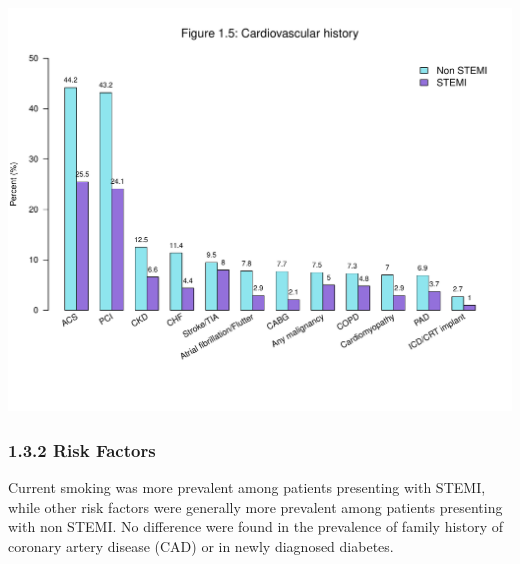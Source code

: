 \documentclass[
]{article}
\begin{document}
\includegraphics{‏‏ACSIS_2024_v1_with_trend_pdf_files/figure-latex/unnamed-chunk-20-1.pdf}

\pagebreak

\subsubsection{1.3.2 Risk Factors}\label{risk-factors}

Current smoking was more prevalent among patients presenting with STEMI,
while other risk factors were generally more prevalent among patients
presenting with non STEMI. No difference were found in the prevalence of
family history of coronary artery disease (CAD) or in newly diagnosed
diabetes.

~
\end{document}
